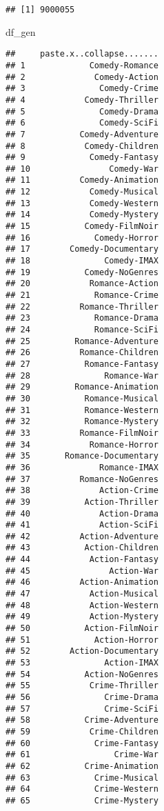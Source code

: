 \documentclass[
]{article}
\newenvironment{Shaded}{\begin{snugshade}}{\end{snugshade}}
\newcommand{\NormalTok}[1]{#1}
\begin{document}
\begin{verbatim}
## [1] 9000055
\end{verbatim}

\begin{Shaded}
\begin{Highlighting}[]
\NormalTok{df_gen}
\end{Highlighting}
\end{Shaded}

\begin{verbatim}
##     paste.x..collapse.......
## 1             Comedy-Romance
## 2              Comedy-Action
## 3               Comedy-Crime
## 4            Comedy-Thriller
## 5               Comedy-Drama
## 6               Comedy-SciFi
## 7           Comedy-Adventure
## 8            Comedy-Children
## 9             Comedy-Fantasy
## 10                Comedy-War
## 11          Comedy-Animation
## 12            Comedy-Musical
## 13            Comedy-Western
## 14            Comedy-Mystery
## 15           Comedy-FilmNoir
## 16             Comedy-Horror
## 17        Comedy-Documentary
## 18               Comedy-IMAX
## 19           Comedy-NoGenres
## 20            Romance-Action
## 21             Romance-Crime
## 22          Romance-Thriller
## 23             Romance-Drama
## 24             Romance-SciFi
## 25         Romance-Adventure
## 26          Romance-Children
## 27           Romance-Fantasy
## 28               Romance-War
## 29         Romance-Animation
## 30           Romance-Musical
## 31           Romance-Western
## 32           Romance-Mystery
## 33          Romance-FilmNoir
## 34            Romance-Horror
## 35       Romance-Documentary
## 36              Romance-IMAX
## 37          Romance-NoGenres
## 38              Action-Crime
## 39           Action-Thriller
## 40              Action-Drama
## 41              Action-SciFi
## 42          Action-Adventure
## 43           Action-Children
## 44            Action-Fantasy
## 45                Action-War
## 46          Action-Animation
## 47            Action-Musical
## 48            Action-Western
## 49            Action-Mystery
## 50           Action-FilmNoir
## 51             Action-Horror
## 52        Action-Documentary
## 53               Action-IMAX
## 54           Action-NoGenres
## 55            Crime-Thriller
## 56               Crime-Drama
## 57               Crime-SciFi
## 58           Crime-Adventure
## 59            Crime-Children
## 60             Crime-Fantasy
## 61                 Crime-War
## 62           Crime-Animation
## 63             Crime-Musical
## 64             Crime-Western
## 65             Crime-Mystery

\end{verbatim}
\end{document}
